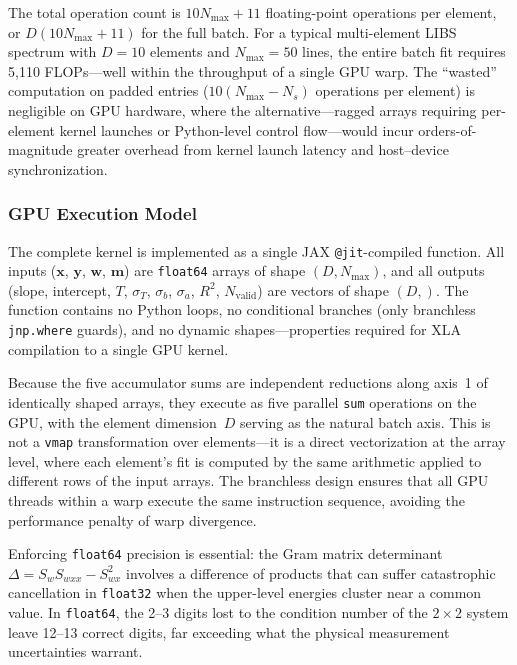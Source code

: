 The total operation count is $10 N_\mathrm{max} + 11$ floating-point operations per element, or $D(10 N_\mathrm{max} + 11)$ for the full batch.
For a typical multi-element LIBS spectrum with $D = 10$ elements and $N_\mathrm{max} = 50$ lines, the entire batch fit requires 5{,}110 FLOPs---well within the throughput of a single GPU warp.
The ``wasted'' computation on padded entries ($10(N_\mathrm{max} - N_s)$ operations per element) is negligible on GPU hardware, where the alternative---ragged arrays requiring per-element kernel launches or Python-level control flow---would incur orders-of-magnitude greater overhead from kernel launch latency and host--device synchronization.

\subsubsection{GPU Execution Model}
\label{sec:boltzmann-gpu}

The complete kernel is implemented as a single JAX \texttt{@jit}-compiled function.
All inputs ($\bm{x}$, $\bm{y}$, $\bm{w}$, $\bm{m}$) are \texttt{float64} arrays of shape $(D, N_\mathrm{max})$, and all outputs (slope, intercept, $T$, $\sigma_T$, $\sigma_b$, $\sigma_a$, $R^2$, $N_\mathrm{valid}$) are vectors of shape $(D,)$.
The function contains no Python loops, no conditional branches (only branchless \texttt{jnp.where} guards), and no dynamic shapes---properties required for XLA compilation to a single GPU kernel.

Because the five accumulator sums are independent reductions along axis~1 of identically shaped arrays, they execute as five parallel \texttt{sum} operations on the GPU, with the element dimension~$D$ serving as the natural batch axis.
This is not a \texttt{vmap} transformation over elements---it is a direct vectorization at the array level, where each element's fit is computed by the same arithmetic applied to different rows of the input arrays.
The branchless design ensures that all GPU threads within a warp execute the same instruction sequence, avoiding the performance penalty of warp divergence.

Enforcing \texttt{float64} precision is essential: the Gram matrix determinant $\Delta = S_w S_{wxx} - S_{wx}^2$ involves a difference of products that can suffer catastrophic cancellation in \texttt{float32} when the upper-level energies cluster near a common value.
In \texttt{float64}, the 2--3 digits lost to the condition number of the $2 \times 2$ system leave 12--13 correct digits, far exceeding what the physical measurement uncertainties warrant.

